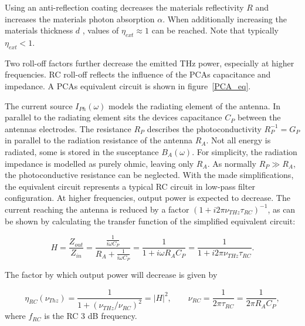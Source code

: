 Using an anti-reflection coating decreases the materials reflectivity $R$ and increases the materials photon absorption $\alpha$. When additionally increasing the materials thickness $d$ , values of $\eta_{ext} \approx 1$ can be reached. Note that typically $\eta_{ext} < 1$. 


Two roll-off factors further decrease the emitted THz power, especially at higher frequencies. RC roll-off reflects the influence of the PCAs capacitance and impedance. A PCAs equivalent circuit \cite{fernandezolveraInternationalSystemUnits2019,collinLimitationsTheveninNorton2003} is shown in figure~\ref{PCA_eq}.

The current source $I_{Ph}(\omega)$ models the radiating element of the antenna. In parallel to the radiating element sits the devices capacitance $C_P$ between the antennas electrodes. The resistance $R_P$ describes the photoconductivity $R_P^{-1} = G_P$ in parallel to the radiation resistance of the antenna $R_A$. Not all energy is radiated, some is stored in the susceptance $B_A(\omega)$. For simplicity, the radiation impedance is modelled as purely ohmic, leaving only $R_A$. As normally $R_{P} \gg R_A$, the photoconductive resistance can be neglected.  With the made simplifications, the equivalent circuit represents a typical RC circuit in low-pass filter configuration. At higher frequencies, output power is expected to decrease. The current reaching the antenna is reduced by a factor $(1 + i2\pi \nu_{THz}\tau_{RC})^{-1}$, as can be shown by calculating the transfer function of the simplified equivalent circuit: 

\begin{equation}
    H = \frac{Z_{out}}{Z_{in}} = \frac{\frac{1}{i\omega C_P}}{R_A + \frac{1}{i\omega C_P}} = \frac{1}{1 + i\omega R_A C_P} = \frac{1}{1 + i 2\pi \nu_{THz} \tau_{RC}}.    
	\label{transferfunction}
\end{equation}

The factor by which output power will decrease is given by 

\begin{equation}
    \eta_{RC}(\nu_{Thz}) = \frac{1}{1+ (\nu_{THz}/\nu_{RC})^2} = |H|^2,  \qquad  \nu_{RC} = \frac{1}{2\pi\tau_{RC}} = \frac{1}{2\pi R_A C_P},
\end{equation}
where $f_{RC}$ is the RC 3 dB frequency.


